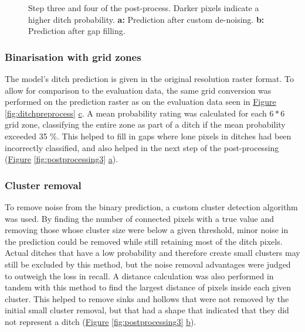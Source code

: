 \documentclass[]{interact}
\theoremstyle{plain}%
\theoremstyle{definition}
\theoremstyle{remark}
\begin{document}
\begin{figure} [!htb]
    \caption{Step three and four of the post-process. Darker pixels indicate a higher ditch probability. \textbf{a: }Prediction after custom de-noising. \textbf{b: }Prediction after gap filling.}
    \label{fig:postprocessing2}
\end{figure}

\subsubsection{Binarisation with grid zones}
The model's ditch prediction is given in the original resolution raster format. To allow for comparison to the evaluation data, the same grid conversion was performed on the prediction raster as on the evaluation data seen in \hyperref[fig:ditchpreprocess]{Figure} \ref{fig:ditchpreprocess} \hyperref[fig:ditchpreprocess]{c}. A mean probability rating was calculated for each $6*6$ grid zone, classifying the entire zone as part of a ditch if the mean probability exceeded 35 \%. This helped to fill in gaps where lone pixels in ditches had been incorrectly classified, and also helped in the next step of the post-processing (\hyperref[fig:postprocessing3]{Figure} \ref{fig:postprocessing3} \hyperref[fig:postprocessing3]{a}).

\subsubsection{Cluster removal}
To remove noise from the binary prediction, a custom cluster detection algorithm was used. By finding the number of connected pixels with a true value and removing those whose cluster size were below a given threshold, minor noise in the prediction could be removed while still retaining most of the ditch pixels. Actual ditches that have a low probability and therefore create small clusters may still be excluded by this method, but the noise removal advantages were judged to outweigh the loss in recall. A distance calculation was also performed in tandem with this method to find the largest distance of pixels inside each given cluster. This helped to remove sinks and hollows that were not removed by the initial small cluster removal, but that had a shape that indicated that they did not represent a ditch (\hyperref[fig:postprocessing3]{Figure} \ref{fig:postprocessing3} \hyperref[fig:postprocessing3]{b}).
\end{document}
